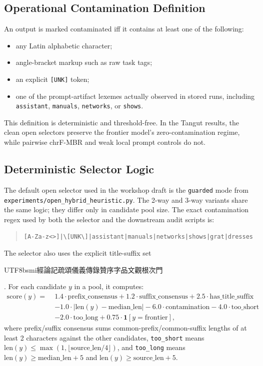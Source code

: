 \documentclass{article}
\newcommand{\zh}[1]{{\begin{CJK*}{UTF8}{bsmi}#1\end{CJK*}}}
\begin{document}
\subsection{Operational Contamination Definition}

An output is marked contaminated iff it contains at least one of the following:
\begin{itemize}
    \item any Latin alphabetic character;
    \item angle-bracket markup such as raw task tags;
    \item an explicit \texttt{[UNK]} token;
    \item one of the prompt-artifact lexemes actually observed in stored runs, including \texttt{assistant}, \texttt{manuals}, \texttt{networks}, or \texttt{shows}.
\end{itemize}

This definition is deterministic and threshold-free. In the Tangut results, the clean open selectors preserve the frontier model's zero-contamination regime, while pairwise chrF-MBR and weak local prompt controls do not.

\subsection{Deterministic Selector Logic}

The default open selector used in the workshop draft is the \texttt{guarded} mode from \texttt{experiments/open\_hybrid\_heuristic.py}. The 2-way and 3-way variants share the same logic; they differ only in candidate pool size. The exact contamination regex used by both the selector and the downstream audit scripts is:
\begin{quote}
\small\ttfamily
\verb+[A-Za-z<>]|\[UNK\]|assistant|manuals|networks|shows|grat|dresses+
\end{quote}

The selector also uses the explicit title-suffix set \zh{經論記疏頌儀義傳錄贊序字品文觀根次門}. For each candidate $y$ in a pool, it computes:
\[
\begin{aligned}
\mathrm{score}(y)=\;&1.4 \cdot \mathrm{prefix\_consensus}
 +1.2 \cdot \mathrm{suffix\_consensus}
 +2.5 \cdot \mathrm{has\_title\_suffix} \\
&-1.0 \cdot |\mathrm{len}(y)-\mathrm{median\_len}|
 -6.0 \cdot \mathrm{contamination}
 -4.0 \cdot \mathrm{too\_short} \\
&-2.0 \cdot \mathrm{too\_long}
 +0.75 \cdot \mathbf{1}[y=\mathrm{frontier}],
\end{aligned}
\]
where prefix/suffix consensus sums common-prefix/common-suffix lengths of at least 2 characters against the other candidates, \texttt{too\_short} means $\mathrm{len}(y) \le \max(1,\lfloor \mathrm{source\_len}/4 \rfloor)$, and \texttt{too\_long} means $\mathrm{len}(y) \ge \mathrm{median\_len}+5$ and $\mathrm{len}(y) \ge \mathrm{source\_len}+5$.
\end{document}
